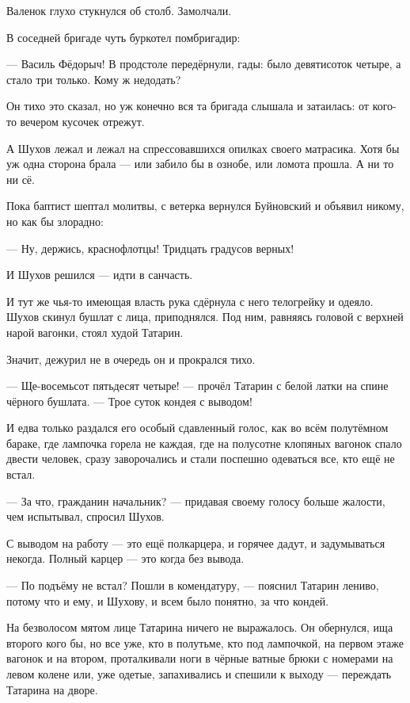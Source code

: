 Валенок глухо стукнулся об столб. Замолчали.

В соседней бригаде чуть буркотел помбригадир:

--- Василь Фёдорыч! В продстоле передёрнули, гады: было девятисоток четыре, а стало три только. Кому ж недодать?

Он тихо это сказал, но уж конечно вся та бригада слышала и затаилась: от кого-то вечером кусочек отрежут.

А Шухов лежал и лежал на спрессовавшихся опилках своего матрасика. Хотя бы уж одна сторона брала --- или забило бы в ознобе, или ломота прошла. А ни то ни сё.

Пока баптист шептал молитвы, с ветерка вернулся Буйновский и объявил никому, но как бы злорадно:

--- Ну, держись, краснофлотцы! Тридцать градусов верных!

И Шухов решился --- идти в санчасть.

И тут же чья-то имеющая власть рука сдёрнула с него телогрейку и одеяло. Шухов скинул бушлат с лица, приподнялся. Под ним, равняясь головой с верхней нарой вагонки, стоял худой Татарин.

Значит, дежурил не в очередь он и прокрался тихо.

--- Ще-восемьсот пятьдесят четыре! --- прочёл Татарин с белой латки на спине чёрного бушлата. --- Трое суток кондея с выводом!

И едва только раздался его особый сдавленный голос, как во всём полутёмном бараке, где лампочка горела не каждая, где на полусотне клопяных вагонок спало двести человек, сразу заворочались и стали поспешно одеваться все, кто ещё не встал.

--- За что, гражданин начальник? --- придавая своему голосу больше жалости, чем испытывал, спросил Шухов.

С выводом на работу --- это ещё полкарцера, и горячее дадут, и задумываться некогда. Полный карцер --- это когда без вывода.

--- По подъёму не встал? Пошли в комендатуру, --- пояснил Татарин лениво, потому что и ему, и Шухову, и всем было понятно, за что кондей.

На безволосом мятом лице Татарина ничего не выражалось. Он обернулся, ища второго кого бы, но все уже, кто в полутьме, кто под лампочкой, на первом этаже вагонок и на втором, проталкивали ноги в чёрные ватные брюки с номерами на левом колене или, уже одетые, запахивались и спешили к выходу --- переждать Татарина на дворе.

